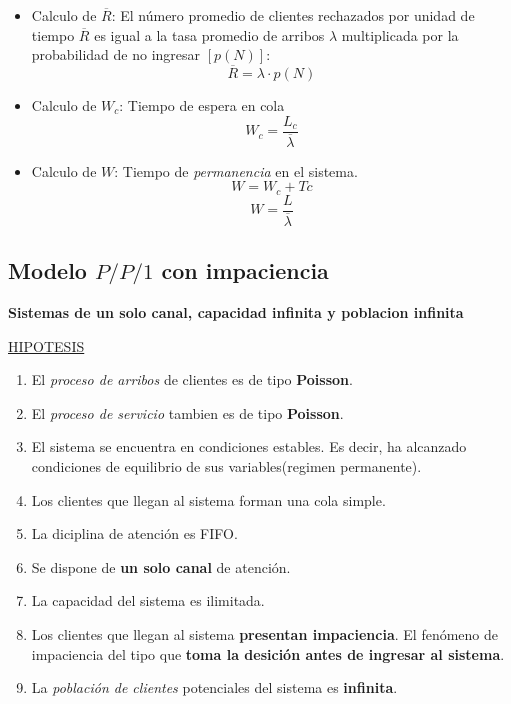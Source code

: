 \documentclass{article}
\begin{document}
\begin{itemize}
    \item Calculo de \(\overline{R}\): El número promedio de clientes rechazados por unidad de tiempo \(\overline{R}\) es igual a la tasa promedio de arribos \(\lambda\) multiplicada por la probabilidad de no ingresar \([p(N)]\):        \begin{equation} \label{eu_eqn}
            \overline{R} = \lambda \cdot p(N)
        \end{equation}  
    \item Calculo de \(W_c\): Tiempo de espera en cola
        \begin{equation}
            W_c = \frac{L_c}{\overline{\lambda}}
        \end{equation}  
    \item Calculo de \(W\): Tiempo de \textit{permanencia} en el sistema.
        \begin{equation} \label{eu_eqn}
            W = W_c+Tc 
        \end{equation}  
        \begin{equation} \label{eu_eqn}
            W = \frac{L}{\overline{\lambda}} 
        \end{equation}
    \end{itemize}


\subsection{Modelo \(P/P/1\) con impaciencia}
\textbf{Sistemas de un solo canal, capacidad infinita y poblacion infinita}

\noindent
\underline{HIPOTESIS}
\begin{enumerate}
    \item El \textit{proceso de arribos} de clientes es de tipo \textbf{Poisson}.
    \item El \textit{proceso de servicio} tambien es de tipo \textbf{Poisson}.
    \item El sistema se encuentra en condiciones estables. Es decir, ha alcanzado condiciones de equilibrio de sus variables(regimen permanente).
    \item Los clientes que llegan al sistema forman una cola simple.
    \item La diciplina de atención es FIFO.
    \item Se dispone de \textbf{un solo canal} de atención.
    \item La capacidad del sistema es ilimitada.
    \item Los clientes que llegan al sistema \textbf{presentan impaciencia}. El fenómeno de impaciencia del tipo que \textbf{toma la desición antes de ingresar al sistema}.
    \item La \textit{población de clientes} potenciales del sistema es \textbf{infinita}.
\end{enumerate}
\end{document}
